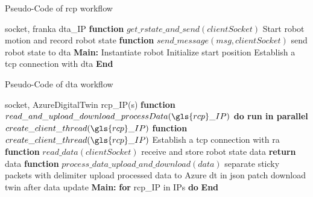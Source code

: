 \begin{breakablealgorithm}
    \caption{Pseudo-Code of \gls{rcp} workflow}
    \label{alg:RCPPseudoCode}
    \begin{algorithmic}
     socket, franka
     \gls{dta}\_IP
    \State \textbf{function} {$get\_rstate\_and\_send(clientSocket)$}
        \State \qquad Start robot motion and record robot state
        \State {}
    \State \textbf{function} {$send\_message(msg, clientSocket)$}
        \State \qquad send robot state to \gls{dta} 
    \State \textbf{Main:}
    \State \qquad Instantiate robot
    \State \qquad Initialize start position
    \State \qquad Establish a \gls{tcp} connection with \gls{dta}  
    \State {}
    \State \textbf{End}
    \end{algorithmic}
\end{breakablealgorithm}


\begin{breakablealgorithm}
    \caption{Pseudo-Code of \gls{dta} workflow}
    \label{alg:DTAgentPseudoCode}
    \begin{algorithmic}
     socket, AzureDigitalTwin
     \gls{rcp}\_IP(s)
    \State \textbf{function} {$read\_and\_upload\_download\_processData(\gls{rcp}\_IP)$}
        \State \qquad \textbf{do run in parallel}
            \State \qquad \qquad $create\_client\_thread(\gls{rcp}\_IP)$       
    \State \textbf{function} {$create\_client\_thread(\gls{rcp}\_IP)$}
        \State \qquad Establish a \gls{tcp} connection with \gls{ra}
        \State {}  
        \State {}    
    \State \textbf{function} {$read\_data(clientSocket)$}
        \State \qquad receive and store robot state data
        \State \qquad \textbf{return} data
    \State \textbf{function} {$process\_data\_upload\_and\_download(data)$}
        \State \qquad separate sticky packets with delimiter
        \State \qquad upload processed data to Azure \gls{dt} in json patch
        \State \qquad download twin after data update 
    \State \textbf{Main:}
        \State \qquad \textbf{for} \gls{rcp}\_IP in IPs \textbf{do}
        \State \qquad {}
        \State \textbf{End}
    \end{algorithmic}
\end{breakablealgorithm}



